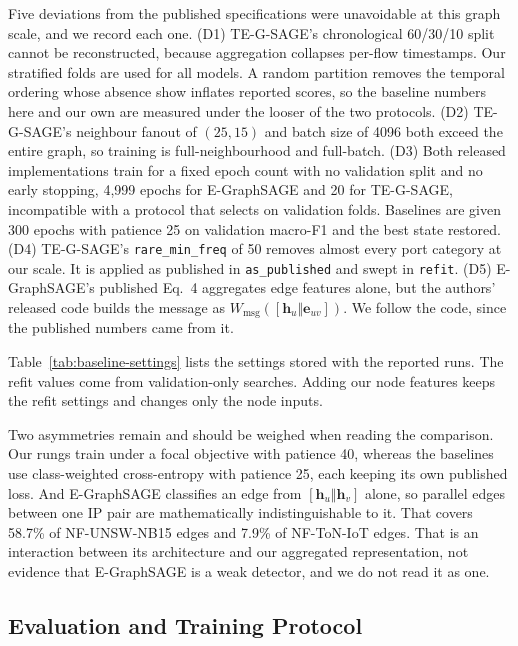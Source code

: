 Five deviations from the published specifications were unavoidable at this graph scale, and we
record each one. (D1) TE-G-SAGE's chronological 60/30/10 split cannot be
reconstructed, because aggregation collapses per-flow timestamps. Our stratified folds are used
for all models. A random partition removes the temporal ordering whose absence
\citet{pendlebury2019tesseract} show inflates reported scores, so the baseline numbers here
and our own are measured under the looser of the two protocols. (D2) TE-G-SAGE's neighbour fanout of $(25, 15)$ and batch size of 4096 both
exceed the entire graph, so training is full-neighbourhood and full-batch. (D3) Both released
implementations train for a fixed epoch count with no validation split and no early
stopping, 4{,}999 epochs for E-GraphSAGE and 20 for TE-G-SAGE, incompatible with a protocol
that selects on validation folds. Baselines are given 300 epochs with patience 25 on validation
macro-F1 and the best state restored. (D4) TE-G-SAGE's \texttt{rare\_min\_freq} of 50 removes
almost every port category at our scale. It is applied as published in \texttt{as\_published}
and swept in \texttt{refit}. (D5) E-GraphSAGE's published Eq.~4 aggregates edge features alone,
but the authors' released code builds the message as $W_{\text{msg}}([\mathbf{h}_u \Vert
\mathbf{e}_{uv}])$. We follow the code, since the published numbers came from it.

Table~\ref{tab:baseline-settings} lists the settings stored with the reported runs. The refit values come from validation-only searches. Adding our node features keeps the refit settings and changes only the node inputs.



Two asymmetries remain and should be weighed when reading the comparison. Our rungs train
under a focal objective with patience 40, whereas the baselines use class-weighted
cross-entropy with patience 25, each keeping its own published loss. And E-GraphSAGE
classifies an edge from $[\mathbf{h}_u \Vert \mathbf{h}_v]$ alone, so parallel edges between
one IP pair are mathematically indistinguishable to it. That covers 58.7\% of NF-UNSW-NB15 edges and
7.9\% of NF-ToN-IoT edges. That is an interaction between its architecture
and our aggregated representation, not evidence that E-GraphSAGE is a weak detector, and we do
not read it as one.

\subsection{Evaluation and Training Protocol}
\label{sec:method-protocol}

